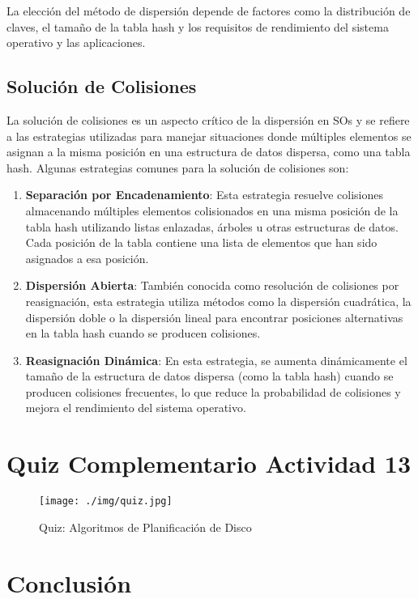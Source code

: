 \documentclass[12pt, a4paper]{article} %
\begin{document}
La elección del método de dispersión depende de factores como la distribución de claves, el tamaño de la tabla hash y los requisitos de rendimiento del sistema operativo y las aplicaciones.

\subsection{Solución de Colisiones}

La solución de colisiones es un aspecto crítico de la dispersión en SOs y se refiere a las estrategias utilizadas para manejar situaciones donde múltiples elementos se asignan a la misma posición en una estructura de datos dispersa, como una tabla hash. Algunas estrategias comunes para la solución de colisiones son:

\begin{enumerate}
	\item \textbf{Separación por Encadenamiento}: Esta estrategia resuelve colisiones almacenando múltiples elementos colisionados en una misma posición de la tabla hash utilizando listas enlazadas, árboles u otras estructuras de datos. Cada posición de la tabla contiene una lista de elementos que han sido asignados a esa posición.
	\item \textbf{Dispersión Abierta}: También conocida como resolución de colisiones por reasignación, esta estrategia utiliza métodos como la dispersión cuadrática, la dispersión doble o la dispersión lineal para encontrar posiciones alternativas en la tabla hash cuando se producen colisiones.
	\item \textbf{Reasignación Dinámica}: En esta estrategia, se aumenta dinámicamente el tamaño de la estructura de datos dispersa (como la tabla hash) cuando se producen colisiones frecuentes, lo que reduce la probabilidad de colisiones y mejora el rendimiento del sistema operativo.
\end{enumerate}

\clearpage
\section{Quiz Complementario Actividad 13}

\begin{figure}[h]
	\centering
	\texttt{[image: ./img/quiz.jpg]}
	\caption{Quiz: Algoritmos de Planificación de Disco}
\end{figure}

\clearpage
\section{Conclusión}
\end{document}
